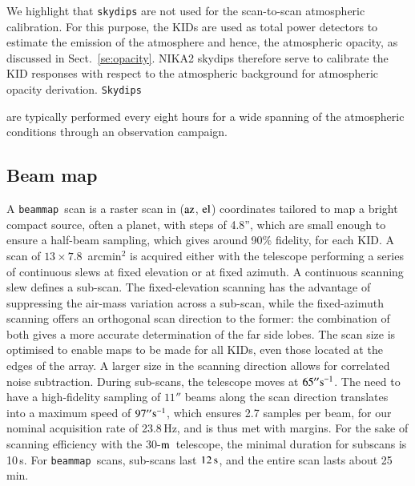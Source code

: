 \documentclass[traditionalabstract]{aa}
\newcommand{\elev}{\rm{el}}
\newcommand{\az}{\rm{az}}
\newcommand{\bm}{{\tt beammap}}
\newcommand{\trentemetre}{30-$\rm{m}$}
\newcommand{\lp}[1]{#1}
\newcommand{\rev}[1]{#1}
\newcommand{\LEt}[1]{{\bf {\color[RGB]{0, 153, 255} #1}}}
\begin{document}
{\lp We highlight that {\tt skydips} are not used for the scan-to-scan atmospheric 
calibration. For this purpose, the KIDs are used as total power
detectors to estimate the emission of the atmosphere and hence, the
atmospheric opacity, as discussed in Sect.~\ref{se:opacity}. 
NIKA2 skydips therefore serve to calibrate the KID responses with
respect to the atmospheric background for atmospheric opacity
derivation.} {\tt Skydips} {\lp are typically performed every eight hours for a wide spanning
of the atmospheric conditions through an observation campaign.


\subsection{Beam map}
\label{se:beammaps}

A \bm\ scan is a raster scan in ($\az$, $\elev$) coordinates tailored to map a
bright compact source, often a planet, with steps of 4.8'', which are
small enough
{\rev to ensure a half-beam sampling, which gives around 90\% fidelity, for
each KID.} 
A scan of 
$13\times7.8$~arcmin$^2$ is acquired either with the telescope
performing a series of continuous slews at fixed elevation or at fixed azimuth. 
A continuous scanning slew defines a sub-scan. 
The fixed-elevation scanning has the advantage of suppressing the air-mass variation
across a sub-scan, while the fixed-azimuth scanning offers an
orthogonal scan direction to the former:
the combination of both gives a more accurate determination of the far side
lobes.
The scan size is optimised to enable maps to be made for all
KIDs, even those located at the edges of the array. A larger size in the scanning
direction allows for correlated noise subtraction.
During sub-scans, the telescope moves at
$65''\rm{s}^{-1}$.%
{\rev The need to have a high-fidelity sampling of $11''$ beams 
along the scan direction translates into a maximum speed of
$97''\rm{s}^{-1}$, which ensures 2.7 samples per beam, for our nominal
acquisition rate of 23.8\,Hz,} and is thus met with margins. For the
sake of scanning efficiency with the \trentemetre\ telescope, the minimal duration for
subscans is 10\,s. For \bm\ scans,
sub-scans last $12\,\rm{s}$, and the entire scan lasts about 25\,min.

}
\end{document}
